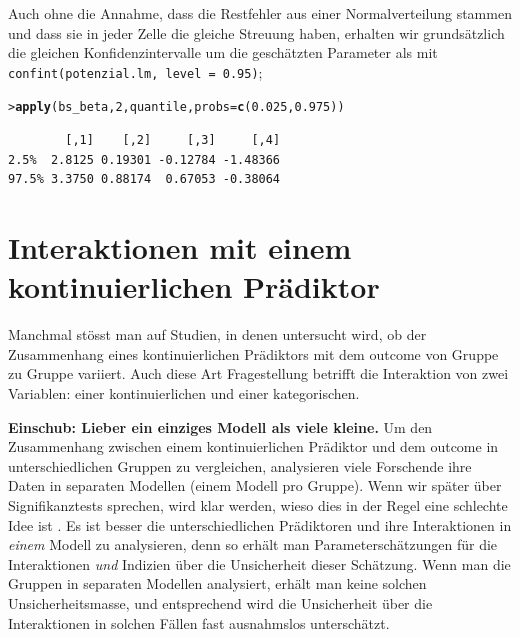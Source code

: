 \documentclass[oneside, 10pt]{book}\usepackage[]{graphicx}\usepackage[]{xcolor}
\makeatletter
\newcommand{\hlnum}[1]{\textcolor[rgb]{0.686,0.059,0.569}{#1}}%
\newcommand{\hlstd}[1]{\textcolor[rgb]{0.345,0.345,0.345}{#1}}%
\newcommand{\hlkwc}[1]{\textcolor[rgb]{0.333,0.667,0.333}{#1}}%
\newcommand{\hlkwd}[1]{\textcolor[rgb]{0.737,0.353,0.396}{\textbf{#1}}}%
\newenvironment{kframe}{%
 \def\at@end@of@kframe{}%
 \ifinner\ifhmode%
  \def\at@end@of@kframe{\end{minipage}}%
  \begin{minipage}{\columnwidth}%
 \fi\fi%
 \def\FrameCommand##1{\hskip\@totalleftmargin \hskip-\fboxsep
 \colorbox{shadecolor}{##1}\hskip-\fboxsep
     \hskip-\linewidth \hskip-\@totalleftmargin \hskip\columnwidth}%
 \MakeFramed {\advance\hsize-\width
   \@totalleftmargin\z@ \linewidth\hsize
   \@setminipage}}%
 {\par\unskip\endMakeFramed%
 \at@end@of@kframe}
\newenvironment{knitrout}{}{} %
\makeatother
\begin{document}
Auch ohne die Annahme, dass die Restfehler aus einer
Normalverteilung stammen und dass sie in jeder Zelle
die gleiche Streuung haben, erhalten wir grundsätzlich
die gleichen Konfidenzintervalle um die geschätzten Parameter
als mit \texttt{confint(potenzial.lm, level = 0.95)};
\begin{knitrout}
\color{fgcolor}\begin{kframe}
\begin{alltt}
\hlstd{> }\hlkwd{apply}\hlstd{(bs_beta,} \hlnum{2}\hlstd{, quantile,} \hlkwc{probs} \hlstd{=} \hlkwd{c}\hlstd{(}\hlnum{0.025}\hlstd{,} \hlnum{0.975}\hlstd{))}
\end{alltt}
\begin{verbatim}
        [,1]    [,2]     [,3]     [,4]
2.5%  2.8125 0.19301 -0.12784 -1.48366
97.5% 3.3750 0.88174  0.67053 -0.38064
\end{verbatim}
\end{kframe}
\end{knitrout}

\section{Interaktionen mit einem kontinuierlichen Prädiktor}\label{sec:interactioncontinuous}
Manchmal stösst man auf Studien, in denen untersucht wird, ob der Zusammenhang
eines kontinuierlichen Prädiktors mit dem outcome von Gruppe zu Gruppe
variiert. Auch diese Art Fragestellung betrifft die Interaktion von zwei Variablen:
einer kontinuierlichen und einer kategorischen.

\medskip

\begin{framed}\label{sec:differencesignificant}
\textbf{Einschub: Lieber ein einziges Modell als viele kleine.}
Um den Zusammenhang zwischen einem kontinuierlichen Prädiktor
und dem outcome in unterschiedlichen
Gruppen zu vergleichen, analysieren viele Forschende ihre Daten in separaten Modellen
(einem Modell pro Gruppe). Wenn wir später über Signifikanztests sprechen,
wird klar werden, wieso dies in der Regel eine schlechte Idee ist
\citep[siehe auch][]{Gelman2006,Nieuwenhuis2011}. Es ist besser die
unterschiedlichen Prädiktoren und ihre Interaktionen in \emph{einem}
Modell zu analysieren, denn so erhält man Parameterschätzungen für
die Interaktionen \emph{und} Indizien über die Unsicherheit dieser Schätzung.
Wenn man die Gruppen in separaten Modellen analysiert, erhält man keine
solchen Unsicherheitsmasse, und entsprechend wird die Unsicherheit über
die Interaktionen in solchen Fällen fast ausnahmslos unterschätzt.
\end{framed}
\end{document}
